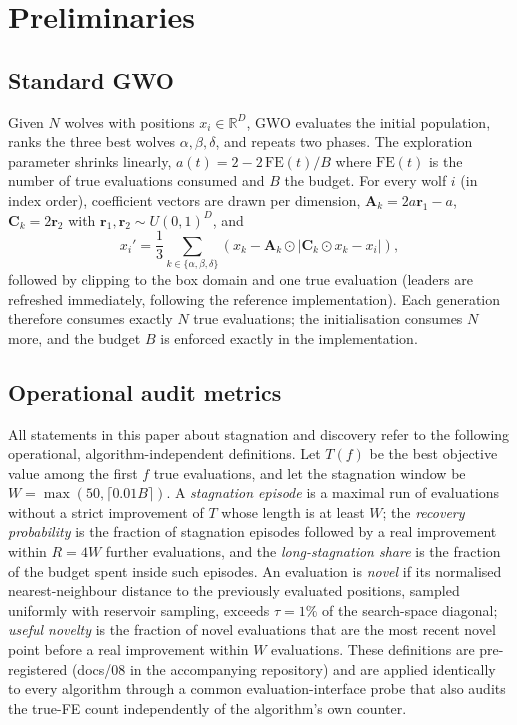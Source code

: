 \documentclass[journal]{IEEEtran}
\begin{document}
\section{Preliminaries}
\subsection{Standard GWO}
Given $N$ wolves with positions $x_i\in\mathbb{R}^D$, GWO evaluates the
initial population, ranks the three best wolves $\alpha,\beta,\delta$, and
repeats two phases. The exploration parameter shrinks linearly,
$a(t)=2-2\,\mathrm{FE}(t)/B$ where $\mathrm{FE}(t)$ is the number of true
evaluations consumed and $B$ the budget. For every wolf $i$ (in index order),
coefficient vectors are drawn per dimension,
$\mathbf{A}_k=2a\mathbf{r}_1-a$, $\mathbf{C}_k=2\mathbf{r}_2$ with
$\mathbf{r}_1,\mathbf{r}_2\sim U(0,1)^D$, and
\begin{equation}
x_i'=\frac{1}{3}\sum_{k\in\{\alpha,\beta,\delta\}}
\left(x_k-\mathbf{A}_k\odot|\mathbf{C}_k\odot x_k-x_i|\right),
\end{equation}
followed by clipping to the box domain and one true evaluation (leaders are
refreshed immediately, following the reference implementation). Each
generation therefore consumes exactly $N$ true evaluations; the initialisation
consumes $N$ more, and the budget $B$ is enforced exactly in the
implementation.

\subsection{Operational audit metrics}
\label{sec:metrics}
All statements in this paper about stagnation and discovery refer to the
following operational, algorithm-independent definitions. Let $T(f)$ be the
best objective value among the first $f$ true evaluations, and let the
stagnation window be $W=\max(50,\lceil 0.01B\rceil)$. A \emph{stagnation
episode} is a maximal run of evaluations without a strict improvement of $T$
whose length is at least $W$; the \emph{recovery probability} is the fraction
of stagnation episodes followed by a real improvement within $R=4W$ further
evaluations, and the \emph{long-stagnation share} is the fraction of the
budget spent inside such episodes. An evaluation is \emph{novel} if its
normalised nearest-neighbour distance to the previously evaluated positions,
sampled uniformly with reservoir sampling, exceeds $\tau=1\%$ of the
search-space diagonal; \emph{useful novelty} is the fraction of novel
evaluations that are the most recent novel point before a real improvement
within $W$ evaluations. These definitions are pre-registered
(docs/08 in the accompanying repository) and are applied identically to every
algorithm through a common evaluation-interface probe that also audits the
true-FE count independently of the algorithm's own counter.
\end{document}
